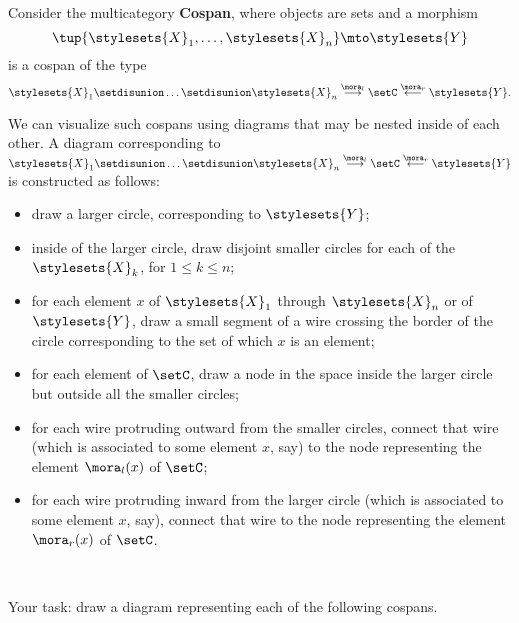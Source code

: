 \begin{gradedexercise}
    \label{ex:HwkCospanMulticat}

    Consider the multicategory \textbf{Cospan}, where objects are sets and a morphism
    \begin{equation}
        \tup{\stylesets{X}_1, \dots, \stylesets{X}_n} \mto \stylesets{Y}
    \end{equation}
    is a cospan of the type
    \begin{equation}
        \stylesets{X}_1 \setdisunion \dots \setdisunion \stylesets{X}_n \overset{\mora_l}{\longrightarrow} \setC \overset{\mora_r}{\longleftarrow} \stylesets{Y}.
    \end{equation}

    We can visualize such cospans using diagrams that may be nested inside of each other.
    A diagram corresponding to $\stylesets{X}_1 \setdisunion \dots \setdisunion \stylesets{X}_n \overset{\mora_l}{\longrightarrow} \setC \overset{\mora_r}{\longleftarrow} \stylesets{Y}$ is constructed as follows:
    \begin{itemize}
        \item draw a larger circle, corresponding to $\stylesets{Y}$;
        \item inside of the larger circle, draw disjoint smaller circles for each of the $\stylesets{X}_k$, for $1 \leq k \leq n$;
        \item for each element $x$ of $\stylesets{X}_1$ through $\stylesets{X}_n$ or of $\stylesets{Y}$, draw a small segment of a wire crossing the border of the circle corresponding to the set of which $x$ is an element;
        \item for each element of $\setC$, draw a node in the space inside the larger circle but outside all the smaller circles;
        \item for each wire protruding outward from the smaller circles, connect that wire (which is associated to some element $x$, say) to the node representing the element $\mora_l(x)$ of $\setC$;
        \item for each wire protruding inward from the larger circle (which is associated to some element $x$, say), connect that wire to the node representing the element $\mora_r(x)$ of $\setC$.
    \end{itemize}

    \

    Your task: draw a diagram representing each of the following cospans.


\end{gradedexercise}
